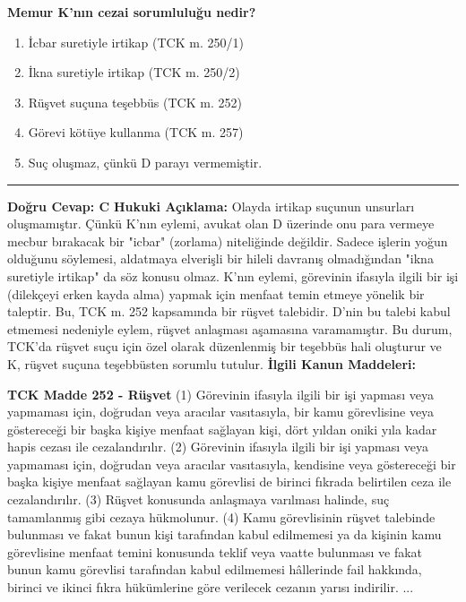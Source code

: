 \documentclass[a4paper, 11pt, twocolumn]{article}
\newenvironment{lawbox}{%
    \par\noindent
    \begin{tcolorbox}[
        colback=lawbg,
        colframe=boxcolor,
        fonttitle=\bfseries,
        boxrule=0.5pt,
        left=3pt,
        right=3pt,
        top=3pt,
        bottom=3pt,
        width=\columnwidth,
        arc=2pt,
        before skip=0.2cm,
        after skip=0.2cm
    ]
    \footnotesize\itshape
}{\end{tcolorbox}}
\begin{document}
\textbf{Memur K'nın cezai sorumluluğu nedir?}
\begin{enumerate}[label=\Alph*)]
    \item İcbar suretiyle irtikap (TCK m. 250/1)
    \item İkna suretiyle irtikap (TCK m. 250/2)
    \item Rüşvet suçuna teşebbüs (TCK m. 252)
    \item Görevi kötüye kullanma (TCK m. 257)
    \item Suç oluşmaz, çünkü D parayı vermemiştir.
\end{enumerate}
\vspace{0.5cm}
\hrule
\vspace{0.5cm}
\textbf{Doğru Cevap: C}
\newline
\textbf{Hukuki Açıklama:} Olayda irtikap suçunun unsurları oluşmamıştır. Çünkü K'nın eylemi, avukat olan D üzerinde onu para vermeye mecbur bırakacak bir "icbar" (zorlama) niteliğinde değildir. Sadece işlerin yoğun olduğunu söylemesi, aldatmaya elverişli bir hileli davranış olmadığından "ikna suretiyle irtikap" da söz konusu olmaz. K'nın eylemi, görevinin ifasıyla ilgili bir işi (dilekçeyi erken kayda alma) yapmak için menfaat temin etmeye yönelik bir taleptir. Bu, TCK m. 252 kapsamında bir rüşvet talebidir. D'nin bu talebi kabul etmemesi nedeniyle eylem, rüşvet anlaşması aşamasına varamamıştır. Bu durum, TCK'da rüşvet suçu için özel olarak düzenlenmiş bir teşebbüs hali oluşturur ve K, rüşvet suçuna teşebbüsten sorumlu tutulur.
\vspace{0.5cm}
\textbf{İlgili Kanun Maddeleri:}
\begin{lawbox}
\textbf{TCK Madde 252 - Rüşvet}
\newline
(1) Görevinin ifasıyla ilgili bir işi yapması veya yapmaması için, doğrudan veya aracılar vasıtasıyla, bir kamu görevlisine veya göstereceği bir başka kişiye menfaat sağlayan kişi, dört yıldan oniki yıla kadar hapis cezası ile cezalandırılır.
\newline
(2) Görevinin ifasıyla ilgili bir işi yapması veya yapmaması için, doğrudan veya aracılar vasıtasıyla, kendisine veya göstereceği bir başka kişiye menfaat sağlayan kamu görevlisi de birinci fıkrada belirtilen ceza ile cezalandırılır.
\newline
(3) Rüşvet konusunda anlaşmaya varılması halinde, suç tamamlanmış gibi cezaya hükmolunur.
\newline
(4) Kamu görevlisinin rüşvet talebinde bulunması ve fakat bunun kişi tarafından kabul edilmemesi ya da kişinin kamu görevlisine menfaat temini konusunda teklif veya vaatte bulunması ve fakat bunun kamu görevlisi tarafından kabul edilmemesi hâllerinde fail hakkında, birinci ve ikinci fıkra hükümlerine göre verilecek cezanın yarısı indirilir.
...
\end{lawbox}
\end{document}
